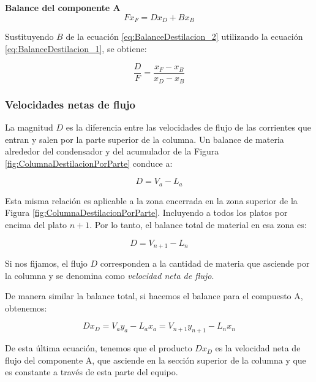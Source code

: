 \documentclass[11pt]{book}
\begin{document}
\textbf{Balance del componente A}
\begin{equation}
    \label{eq:BalanceDestilacion_2}
    F x_F = D x_D + B x_B
\end{equation}

Sustituyendo $B$ de la ecuación \ref{eq:BalanceDestilacion_2} utilizando la ecuación \ref{eq:BalanceDestilacion_1}, se obtiene:

\begin{equation}
    \label{eq:BalanceDestilacion_3}
    \frac{D}{F} = \frac{x_F - x_B}{x_D - x_B}
\end{equation}

\subsubsection{Velocidades netas de flujo}

La magnitud $D$ es la diferencia entre las velocidades de flujo de las corrientes que entran y salen por la parte superior de la columna. Un balance de materia alrededor del condensador y del acumulador de la Figura \ref{fig:ColumnaDestilacionPorParte} conduce a:

\begin{equation}
    \label{eq:BalanceDestilacion_4}
    D = V_a - L_a
\end{equation}

Esta misma relación es aplicable a la zona encerrada en la zona superior de la Figura \ref{fig:ColumnaDestilacionPorParte}. Incluyendo a todos los platos por encima del plato $n+1$. Por lo tanto, el balance total de material en esa zona es:

\begin{equation}
    \label{eq:BalanceDestilacion_5}
    D = V_{n+1} - L_n
\end{equation}

Si nos fijamos, el flujo $D$ corresponden a la cantidad de materia que asciende por la columna y se denomina como \textit{velocidad neta de flujo}. 

De manera similar la balance total, si hacemos el balance para el compuesto A, obtenemos:

\begin{equation}
    \label{eq:BalanceDestilacion_6}
    D x_D = V_{a} y_a - L_a x_a = V_{n+1} y_{n+1} - L_n x_n
\end{equation}

De esta última ecuación, tenemos que el producto $Dx_D$ es la velocidad neta de flujo del componente A, que asciende en la sección superior de la columna y que es constante a través de esta parte del equipo.
\end{document}
